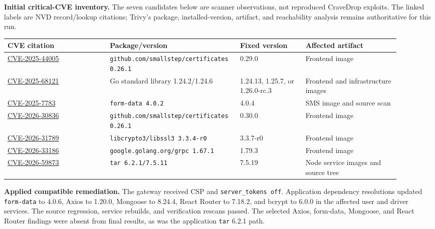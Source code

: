 \documentclass[11pt]{article}
\begin{document}
\textbf{Initial critical-CVE inventory.} The seven candidates below are scanner observations, not reproduced CraveDrop exploits. The linked labels are NVD record/lookup citations; Trivy's package, installed-version, artifact, and reachability analysis remains authoritative for this run.

\begin{longtable}{P{0.25\linewidth}P{0.27\linewidth}P{0.16\linewidth}P{0.23\linewidth}}
\toprule
{}\textbf{CVE citation} & \textbf{Package/version} & \textbf{Fixed version} & \textbf{Affected artifact} \\
\midrule
\endhead
\href{https://nvd.nist.gov/vuln/detail/CVE-2025-44005}{CVE-2025-44005} & \texttt{github.com/}\newline\texttt{smallstep/certificates 0.26.1} & 0.29.0 & Frontend image \\
\href{https://nvd.nist.gov/vuln/detail/CVE-2025-68121}{CVE-2025-68121} & Go standard library 1.24.2/1.24.6 & 1.24.13, 1.25.7, or 1.26.0-rc.3 & Frontend and infrastructure images \\
\href{https://nvd.nist.gov/vuln/detail/CVE-2025-7783}{CVE-2025-7783} & \texttt{form-data 4.0.2} & 4.0.4 & SMS image and source scan \\
\href{https://nvd.nist.gov/vuln/detail/CVE-2026-30836}{CVE-2026-30836} & \texttt{github.com/}\newline\texttt{smallstep/certificates 0.26.1} & 0.30.0 & Frontend image \\
\href{https://nvd.nist.gov/vuln/detail/CVE-2026-31789}{CVE-2026-31789} & \texttt{libcrypto3/libssl3 3.3.4-r0} & 3.3.7-r0 & Frontend image \\
\href{https://nvd.nist.gov/vuln/detail/CVE-2026-33186}{CVE-2026-33186} & \texttt{google.golang.org/grpc 1.67.1} & 1.79.3 & Frontend image \\
\href{https://nvd.nist.gov/vuln/detail/CVE-2026-59873}{CVE-2026-59873} & \texttt{tar 6.2.1/7.5.11} & 7.5.19 & Node service images and source tree \\
\bottomrule
\end{longtable}

\begin{sloppypar}
\textbf{Applied compatible remediation.} The gateway received CSP and \texttt{server\_tokens off}. Application dependency resolutions updated \texttt{form-data} to 4.0.6, Axios to 1.20.0, Mongoose to 8.24.4, React Router to 7.18.2, and bcrypt to 6.0.0 in the affected user and driver services. The source regression, service rebuilds, and verification rescans passed. The selected Axios, form-data, Mongoose, and React Router findings were absent from final results, as was the application \texttt{tar} 6.2.1 path.
\end{sloppypar}
\end{document}
